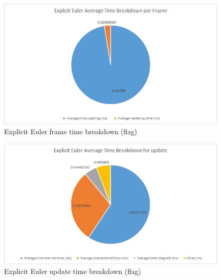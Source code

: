    \begin{figure}
    \begin{center}
      \includegraphics[scale=.9]{Figures/flag_ee_ft}
    \end{center}
    \caption{Explicit Euler frame time breakdown (flag)}
    \label{fig:ee ft flag}
  \end{figure}
  
    \begin{figure}
    \begin{center}
      \includegraphics[scale=.9]{Figures/flag_ee_ut}
    \end{center}
    \caption{Explicit Euler update time breakdown (flag)}
    \label{fig:ee ut flag}
  \end{figure}

